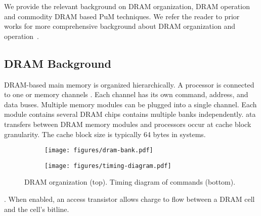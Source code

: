 
{We provide the relevant background on DRAM organization, DRAM operation and commodity DRAM based PuM techniques. We refer the reader to prior works for more comprehensive background about DRAM organization and operation~\cite{salp,lee.hpca13,donghyuk-ddma,chang.sigmetrics17,ghose2018vampire,patel2017reaper,luo2020clr,ghose2019demystifying,kevinchang-thesis,yoongu-thesis,lee.thesis16,olgun2021quactrng}.}

\subsection{DRAM Background}
\label{sec:background-dram}
DRAM-based main memory is organized hierarchically.  A processor is connected to one or  {memory channels }. Each channel has its own command, address, and data buses. Multiple {memory modules} can be plugged into a single channel. Each module contains several {DRAM chips} contains multiple { banks}  independently\new{~\boldthree{}}.
ata transfers between DRAM memory modules and processors occur at {cache block} granularity. The cache block size is typically 64 bytes in  systems.


\begin{figure}[h]
     \centering
     
     \begin{subfigure}[h]{.50\textwidth}
         \centering
         \texttt{[image: figures/dram-bank.pdf]}
     \end{subfigure}
     \hfill
     \begin{subfigure}[h]{.45\textwidth}
         \centering
         \texttt{[image: figures/timing-diagram.pdf]}
     \end{subfigure}
    
    \caption{DRAM organization (top). Timing diagram of  commands (bottom).}
    
    \label{fig:dram-bank-timing-diagram}
\end{figure}

 . When enabled, an access transistor allows charge to flow between a DRAM cell and the cell's bitline.

